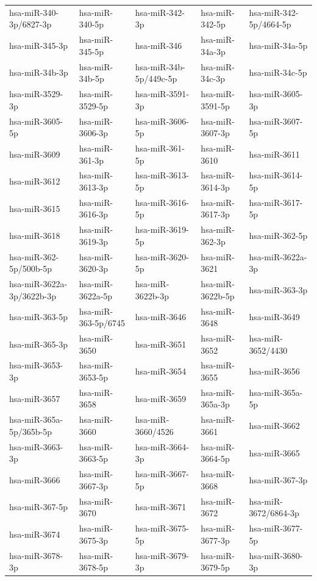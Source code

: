 \begin{longtable}{lllll}
hsa-miR-340-3p/6827-3p & hsa-miR-340-5p & hsa-miR-342-3p & hsa-miR-342-5p & hsa-miR-342-5p/4664-5p \\
hsa-miR-345-3p & hsa-miR-345-5p & hsa-miR-346 & hsa-miR-34a-3p & hsa-miR-34a-5p \\
hsa-miR-34b-3p & hsa-miR-34b-5p & hsa-miR-34b-5p/449c-5p & hsa-miR-34c-3p & hsa-miR-34c-5p \\
hsa-miR-3529-3p & hsa-miR-3529-5p & hsa-miR-3591-3p & hsa-miR-3591-5p & hsa-miR-3605-3p \\
hsa-miR-3605-5p & hsa-miR-3606-3p & hsa-miR-3606-5p & hsa-miR-3607-3p & hsa-miR-3607-5p \\
hsa-miR-3609 & hsa-miR-361-3p & hsa-miR-361-5p & hsa-miR-3610 & hsa-miR-3611 \\
hsa-miR-3612 & hsa-miR-3613-3p & hsa-miR-3613-5p & hsa-miR-3614-3p & hsa-miR-3614-5p \\
hsa-miR-3615 & hsa-miR-3616-3p & hsa-miR-3616-5p & hsa-miR-3617-3p & hsa-miR-3617-5p \\
hsa-miR-3618 & hsa-miR-3619-3p & hsa-miR-3619-5p & hsa-miR-362-3p & hsa-miR-362-5p \\
hsa-miR-362-5p/500b-5p & hsa-miR-3620-3p & hsa-miR-3620-5p & hsa-miR-3621 & hsa-miR-3622a-3p \\
hsa-miR-3622a-3p/3622b-3p & hsa-miR-3622a-5p & hsa-miR-3622b-3p & hsa-miR-3622b-5p & hsa-miR-363-3p \\
hsa-miR-363-5p & hsa-miR-363-5p/6745 & hsa-miR-3646 & hsa-miR-3648 & hsa-miR-3649 \\
hsa-miR-365-3p & hsa-miR-3650 & hsa-miR-3651 & hsa-miR-3652 & hsa-miR-3652/4430 \\
hsa-miR-3653-3p & hsa-miR-3653-5p & hsa-miR-3654 & hsa-miR-3655 & hsa-miR-3656 \\
hsa-miR-3657 & hsa-miR-3658 & hsa-miR-3659 & hsa-miR-365a-3p & hsa-miR-365a-5p \\
hsa-miR-365a-5p/365b-5p & hsa-miR-3660 & hsa-miR-3660/4526 & hsa-miR-3661 & hsa-miR-3662 \\
hsa-miR-3663-3p & hsa-miR-3663-5p & hsa-miR-3664-3p & hsa-miR-3664-5p & hsa-miR-3665 \\
hsa-miR-3666 & hsa-miR-3667-3p & hsa-miR-3667-5p & hsa-miR-3668 & hsa-miR-367-3p \\
hsa-miR-367-5p & hsa-miR-3670 & hsa-miR-3671 & hsa-miR-3672 & hsa-miR-3672/6864-3p \\
hsa-miR-3674 & hsa-miR-3675-3p & hsa-miR-3675-5p & hsa-miR-3677-3p & hsa-miR-3677-5p \\
hsa-miR-3678-3p & hsa-miR-3678-5p & hsa-miR-3679-3p & hsa-miR-3679-5p & hsa-miR-3680-3p \\

\end{longtable}
